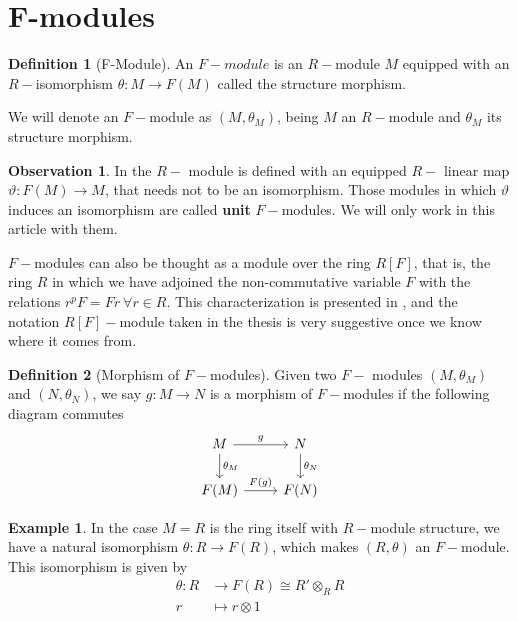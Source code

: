 \documentclass[leqno]{article}
\theoremstyle{definition}
\newtheorem{definition}{Definition}[section]
\newtheorem{observation}{Observation}[section]
\newtheorem{example}{Example}[section]
\begin{document}
\section{F-modules}

\begin{definition}[F-Module] An $F-module$ is an $R-$module $M$ equipped with an $R-$isomorphism  $\theta:M \to F(M)$ called the structure morphism.
\end{definition}

We will denote an $F-$module as  $(M, \theta_M)$, being $M$ an  $R-$module and  $\theta _M$ its structure morphism.

\begin{observation} In \cite{blickle} the $R-$ module is defined with an equipped $R-$ linear map $\vartheta : F(M)\to M$, that needs not to be an isomorphism. Those modules in which $\vartheta$ induces an isomorphism are called \textbf{unit} $F-$modules. We will only work in this article with them.
\end{observation}

$F-$modules can also be thought as a module over the ring  $R[F]$, that is, the ring  $R$ in which we have adjoined the non-commutative variable  $F$ with the relations  $r^pF = Fr \ \forall r\in R$. This characterization is presented in \cite{blickle}, and the notation $R[F]-$module taken in the thesis is very suggestive once we know where it comes from.



\begin{definition}[Morphism of $F-$modules] Given two  $F-$ modules  $(M, \theta _M)$ and $(N, \theta _N)$, we say $g:M\to N$ is a morphism of $F-$modules if the following diagram commutes
\[\begin{tikzcd}
	M & N \\
	{F(M)} & {F(N)}
	\arrow["{\theta_M}", from=1-1, to=2-1]
	\arrow["{\theta_N}", from=1-2, to=2-2]
	\arrow["g", from=1-1, to=1-2]
	\arrow["{F(g)}", from=2-1, to=2-2]
\end{tikzcd}\]
\end{definition}

\begin{example} In the case $M=R$ is the ring itself with  $R-$module structure, we have a natural isomorphism  $\theta : R \to F(R)$, which makes $(R, \theta )$ an $F-$module. This isomorphism is given by
  \begin{align*}
	\theta : R &\to F(R)\cong R' \otimes _R R \\
	r &\mapsto r \otimes 1
  \end{align*}

\end{example}
\end{document}
